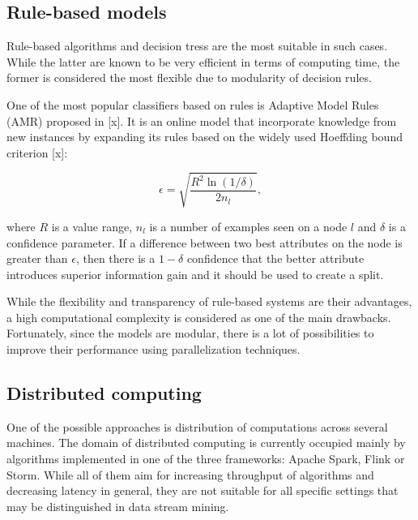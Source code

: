 \documentclass[journal]{IEEEtran}
\begin{document}
\subsection{Rule-based models}
Rule-based algorithms and decision tress are the most suitable in such cases. While the latter are known to be very efficient in terms of computing time, the former is considered the most flexible due to modularity of decision rules.

One of the most popular classifiers based on rules is Adaptive Model Rules (AMR) proposed in [x]. It is an online model that incorporate knowledge from new instances by expanding its rules based on the widely used Hoeffding bound criterion [x]:

\begin{equation}
\label{eq:hbound}
\epsilon = \sqrt{\frac{R^2\ln(1/\delta)}{2n_l}},
\end{equation} 

\noindent where $R$ is a value range, $n_l$ is a number of examples seen on a node $l$ and $\delta$ is a confidence parameter. If a difference between two best attributes on the node is greater than $\epsilon$, then there is a $1-\delta$ confidence that the better attribute introduces superior information gain and it should be used to create a split.

While the flexibility and transparency of rule-based systems are their advantages, a high computational complexity is considered as one of the main drawbacks. Fortunately, since the models are modular, there is a lot of possibilities to improve their performance using parallelization techniques.

\subsection{Distributed computing}

One of the possible approaches is distribution of computations across several machines. The domain of distributed computing is currently occupied mainly by algorithms implemented in one of the three frameworks: Apache Spark, Flink or Storm. While all of them aim for increasing throughput of algorithms and decreasing latency in general, they are not suitable for all specific settings that may be distinguished in data stream mining.
\end{document}

